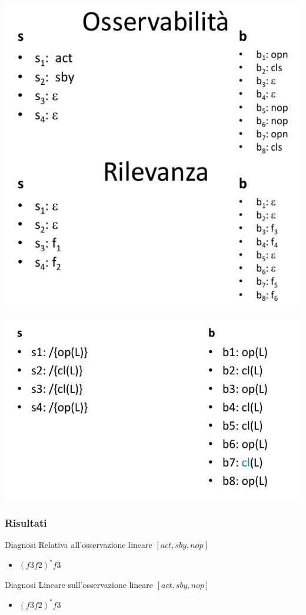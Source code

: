 \includegraphics[width=\textwidth]{immagini/t1oss.png}

\includegraphics[width=\textwidth]{immagini/T1es.png}

\subsubsection{Risultati}
Diagnosi Relativa all'osservazione lineare $[act, sby, nop]$
\begin{itemize}
    \item  $(f3f2)^{*}f3$
\end{itemize}
Diagnosi Lineare sull'osservazione lineare $[act, sby, nop]$
\begin{itemize}
    \item $(f3f2)^{*}f3$
\end{itemize}

